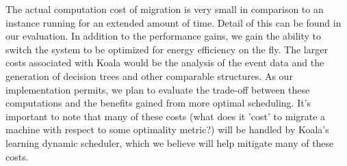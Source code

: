 The actual computation cost of migration is very small in comparison to an
instance running for an extended amount of time.  Detail of this can be found in
our evaluation.  In addition to the performance gains, we gain the ability to
switch the system to be optimized for energy efficiency on the fly.  The larger
costs associated with Koala would be the analysis of the event data and the
generation of decision trees and other comparable structures.  As our
implementation permits, we plan to evaluate the trade-off between these
computations and the benefits gained from more optimal scheduling.  It's
important to note that many of these costs (what does it 'cost' to migrate a
machine with respect to some optimality metric?) will be handled by Koala's
learning dynamic scheduler, which we believe will help mitigate many of
these costs.
